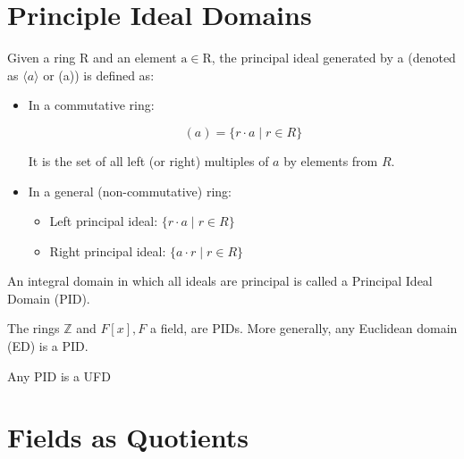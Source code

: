 \section{Principle Ideal Domains}

\begin{definition}
  Given a ring R and an element \(\mathrm{a} \in \mathrm{R}\), the principal ideal generated by a (denoted as \(\langle a\rangle\) or (a)) is defined as: 
\begin{itemize}
  \item In a commutative ring:

\[
(a)=\{r \cdot a \mid r \in R\}
\]

It is the set of all left (or right) multiples of \(a\) by elements from \(R\).
\item In a general (non-commutative) ring:
\begin{itemize}
\item Left principal ideal: \(\{r \cdot a \mid r \in R\}\)
\item Right principal ideal: \(\{a \cdot r \mid r \in R\}\)
\end{itemize}
\end{itemize}
\end{definition}

\begin{definition}

An integral domain in which all ideals are principal is called a Principal Ideal Domain (PID).
  
\end{definition}

\begin{theorem}
  The rings \(\mathbb{Z}\) and \(F[x], F\) a field, are PIDs. More generally, any Euclidean domain (ED) is a PID.
\end{theorem}

\begin{proofidea}
  
  
\end{proofidea}
  
\begin{formalproof}
  
\end{formalproof} 

\begin{theorem}
Any PID is a UFD
\end{theorem}

\section{Fields as Quotients}

